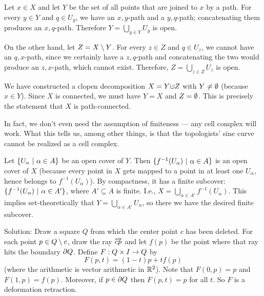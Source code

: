Let $x\in X$ and let $Y$ be the set of all points that are joined
to $x$ by a path. For every $y\in Y$ and $q\in U_y$, we
have an $x,y$-path and a $y,q$-path; concatenating them produces
an $x,q$-path.  Therefore $Y=\bigcup_{y\in Y} U_y$ is open.

On the other hand, let $Z=X\setminus Y$.
For every $z\in Z$ and $q\in U_z$, we
cannot have an $q,x$-path, since we certainly have
a $z,q$-path and concatenating the two would produce an
$z,x$-path, which cannot exist.  Therefore,
$Z=\bigcup_{z\in Z} U_z$ is open.

We have constructed a clopen decomposition $X=Y\dju Z$
with $Y\neq\emptyset$ (because $x\in Y$).
Since $X$ is connected, we must have $Y=X$ and $Z=\emptyset$.
This is precisely the statement that $X$ is path-connected.

In fact, we don't even need the assumption of
finiteness --- any cell complex will work.
What this tells us, among other things, is that the topologists' sine curve cannot be
realized as a cell complex.

\pagebreak

\soln Let $\{U_\alpha~|~\alpha\in A\}$ be an open cover
of $Y$.  Then $\{f^{-1}(U_\alpha)~|~\alpha\in A\}$ is an open cover
of $X$ (because every point in $X$ gets mapped to
a point in at least one $U_\alpha$, hence belongs to $f^{-1}(U_\alpha)$).
By compactness, it has a finite subcover:
$\{f^{-1}(U_\alpha)~|~\alpha\in A'\}$, where $A'\subseteq A$ is finite.
I.e., $X=\bigcup_{\alpha\in A'}f^{-1}(U_\alpha)$.
This implies set-theoretically that $Y=\bigcup_{\alpha\in A'}U_\alpha$,
so there we have the desired finite subcover.


Solution: Draw a square $Q$ from which the center point $c$ has been deleted.  For each point $p\in Q\setminus c$, draw the ray $\overrightarrow{cp}$ and let $f(p)$ be the point where that ray hits the boundary $\partial Q$.  Define $F:Q\times I\to Q$ by
\[F(p,t) = (1-t)p + t f(p)\]
(where the arithmetic is vector arithmetic in $\mathbb{R}^2$).  Note that $F(0,p)=p$ and $F(1,p)=f(p)$.  Moreover, if $p\in\partial Q$ then $F(p,t)=p$ for all $t$.  So $F$ is a deformation retraction.

